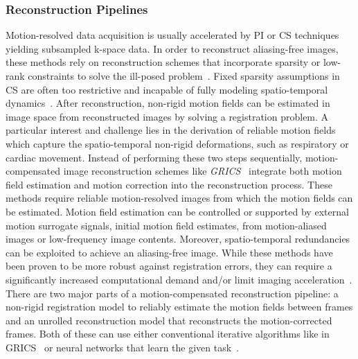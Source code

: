 \subsubsection{Reconstruction Pipelines} \label{SubSubSec:ReconstructionPipelines}
Motion-resolved data acquisition is usually accelerated by PI or CS techniques yielding subsampled k-space data. In order to reconstruct aliasing-free images, these methods rely on reconstruction schemes that incorporate sparsity or low-rank constraints to solve the ill-posed problem~\cite{CS-MRI,ParallelMRI,LowRank+SparseMRI}. Fixed sparsity assumptions in CS are often too restrictive and incapable of fully modeling spatio-temporal dynamics~\cite{Kuestner2022}. 
After reconstruction, non-rigid motion fields can be estimated in image space from reconstructed images by solving a registration problem. A particular interest and challenge lies in the derivation of reliable motion fields which capture the spatio-temporal non-rigid deformations, such as respiratory or cardiac movement. Instead of performing these two steps sequentially, motion-compensated image reconstruction schemes like \emph{GRICS}~\cite{GRICS} integrate both motion field estimation and motion correction into the reconstruction process. These methods require reliable motion-resolved images from which the motion fields can be estimated. Motion field estimation can be controlled or supported by external motion surrogate signals, initial motion field estimates, from motion-aliased images or low-frequency image contents. Moreover, spatio-temporal redundancies can be exploited to achieve an aliasing-free image. While these methods have been proven to be more robust against registration errors, they can require a significantly increased computational demand and/or limit imaging acceleration~\cite{Kuestner2022}.\\
There are two major parts of a motion-compensated reconstruction pipeline: a non-rigid registration model to reliably estimate the motion fields between frames and an unrolled reconstruction model that reconstructs the motion-corrected frames. Both of these can use either conventional iterative algorithms like in GRICS~\cite{GRICS} or neural networks that learn the given task~\cite{Kuestner2022}.


